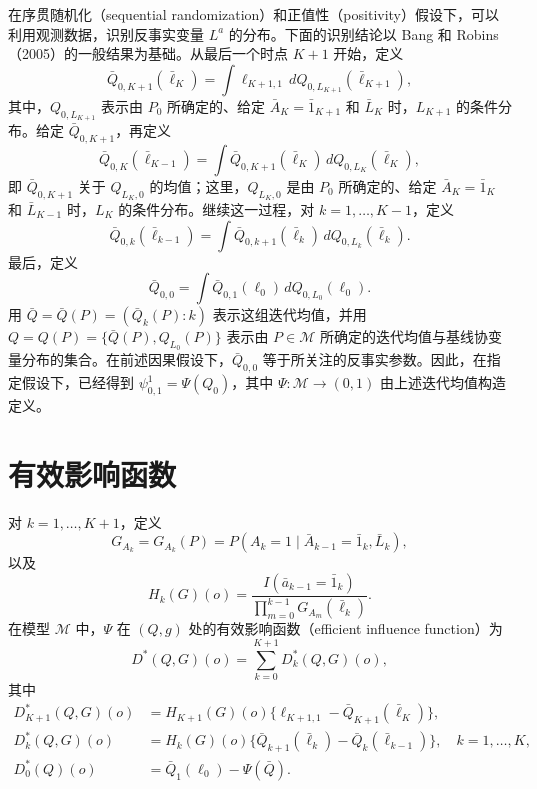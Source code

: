 在序贯随机化（sequential randomization）和正值性（positivity）假设下，可以利用观测数据，识别反事实变量 $L^a$ 的分布。下面的识别结论以 Bang 和 Robins（2005）的一般结果为基础。从最后一个时点 $K+1$ 开始，定义
\[
 \bar Q_{0,K+1}(\bar\ell_K)
 =\int \ell_{K+1,1}\,dQ_{0,L_{K+1}}(\bar\ell_{K+1}),
\]
其中，$Q_{0,L_{K+1}}$ 表示由 $P_0$ 所确定的、给定 $\bar A_K=\bar1_{K+1}$ 和 $\bar L_K$ 时，$L_{K+1}$ 的条件分布。给定 $\bar Q_{0,K+1}$，再定义
\[
 \bar Q_{0,K}(\bar\ell_{K-1})
 =\int \bar Q_{0,K+1}(\bar\ell_K)\,dQ_{0,L_K}(\bar\ell_K),
\]
即 $\bar Q_{0,K+1}$ 关于 $Q_{L_K,0}$ 的均值；这里，$Q_{L_K,0}$ 是由 $P_0$ 所确定的、给定 $\bar A_K=\bar1_K$ 和 $\bar L_{K-1}$ 时，$L_K$ 的条件分布。继续这一过程，对 $k=1,\ldots,K-1$，定义
\[
 \bar Q_{0,k}(\bar\ell_{k-1})
 =\int \bar Q_{0,k+1}(\bar\ell_k)\,dQ_{0,L_k}(\bar\ell_k).
\]
最后，定义
\[
 \bar Q_{0,0}=\int \bar Q_{0,1}(\ell_0)\,dQ_{0,L_0}(\ell_0).
\]
用 $\bar Q=\bar Q(P)=(\bar Q_k(P):k)$ 表示这组迭代均值，并用
$Q=Q(P)=\{\bar Q(P),Q_{L_0}(P)\}$
表示由 $P\in\mathcal M$ 所确定的迭代均值与基线协变量分布的集合。在前述因果假设下，$\bar Q_{0,0}$ 等于所关注的反事实参数。因此，在指定假设下，已经得到 $\psi_{0,1}^1=\Psi(Q_0)$，其中 $\Psi:\mathcal M\to(0,1)$ 由上述迭代均值构造定义。

\section{有效影响函数}

对 $k=1,\ldots,K+1$，定义
\[
 G_{A_k}=G_{A_k}(P)=P(A_k=1\mid\bar A_{k-1}=\bar1_k,\bar L_k),
\]
以及
\[
 H_k(G)(o)=
 \frac{I(\bar a_{k-1}=\bar1_k)}
 {\displaystyle\prod_{m=0}^{k-1}G_{A_m}(\bar\ell_k)}.
\]
在模型 $\mathcal M$ 中，$\Psi$ 在 $(Q,g)$ 处的有效影响函数（efficient influence function）为
\[
 D^*(Q,G)(o)=\sum_{k=0}^{K+1}D_k^*(Q,G)(o),
\]
其中
\[
 \begin{aligned}
 D_{K+1}^*(Q,G)(o)
 &=H_{K+1}(G)(o)\{\ell_{K+1,1}-\bar Q_{K+1}(\bar\ell_K)\},\\
 D_k^*(Q,G)(o)
 &=H_k(G)(o)\{\bar Q_{k+1}(\bar\ell_k)-\bar Q_k(\bar\ell_{k-1})\},
 \quad k=1,\ldots,K,\\
 D_0^*(Q)(o)&=\bar Q_1(\ell_0)-\Psi(\bar Q).
 \end{aligned}
\]
